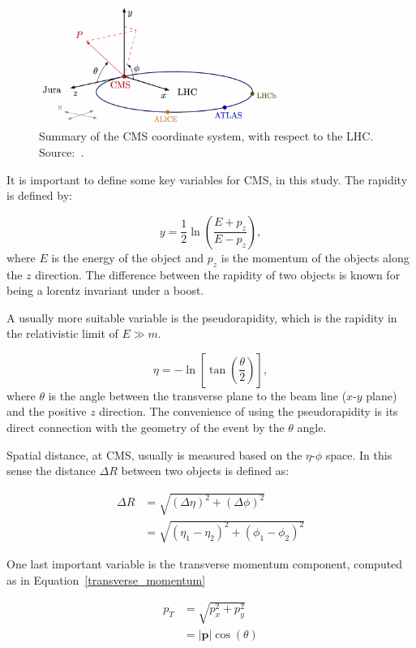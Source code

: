 \begin{figure}[htbp]
    \centering
    \includegraphics[width=0.7\textwidth]{figures_and_tables/experimental_setup/cms_coordinate_system.png}
    \caption{Summary of the CMS coordinate system, with respect to the LHC. Source:~\cite{cms_coordinate_system}.}
    \label{cms_coordinate_system}
\end{figure}

It is important to define some key variables for CMS, in this study. The rapidity is defined by:

\begin{equation}
    y=\frac{1}{2} \ln \left( \frac{E+p_z}{E-p_z} \right),
    \label{rapidity}
\end{equation}
where $E$ is the energy of the object and $p_z$ is the momentum of the objects along the $z$ direction. The difference between the rapidity of two objects is known for being a lorentz invariant under a boost.

A usually more suitable variable is the pseudorapidity, which is the rapidity in the relativistic limit of $E \gg m$.

\begin{equation}
    \eta = - \ln \left [ \tan \left( \frac{\theta}{2} \right)\right],
    \label{pseudorapidity}
\end{equation}
where $\theta$ is the angle between the transverse plane to the beam line ($x$-$y$ plane) and the positive $z$ direction. The convenience of using the pseudorapidity is its direct connection with the geometry of the event by the $\theta$ angle.

Spatial distance, at CMS, usually is measured based on the $\eta$-$\phi$ space. In this sense the distance $\Delta R$ between two objects is defined as:

\begin{equation}
    \begin{split}
        \Delta R &= \sqrt{(\Delta \eta)^2+(\Delta \phi)^2} \\
        & =\sqrt{(\eta_1 - \eta_2)^2+(\phi_1 - \phi_2)^2}
    \end{split}
    \label{delta_R}
\end{equation}

One last important variable is the transverse momentum component, computed as in Equation~\ref{transverse_momentum}

\begin{equation}
    \begin{split}
        p_T &= \sqrt{p_x^2 + p_y^2} \\
        & =|\mathbf{p}| \cos(\theta)
    \end{split}
    \label{transverse_momentum}
\end{equation}